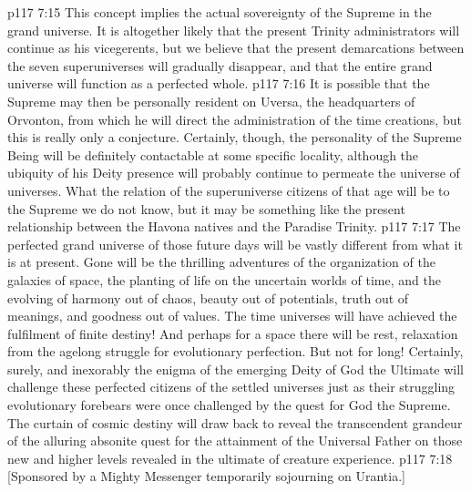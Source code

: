 \vs p117 7:15 This concept implies the actual sovereignty of the Supreme in the grand universe. It is altogether likely that the present Trinity administrators will continue as his vicegerents, but we believe that the present demarcations between the seven superuniverses will gradually disappear, and that the entire grand universe will function as a perfected whole.
\vs p117 7:16 It is possible that the Supreme may then be personally resident on Uversa, the headquarters of Orvonton, from which he will direct the administration of the time creations, but this is really only a conjecture. Certainly, though, the personality of the Supreme Being will be definitely contactable at some specific locality, although the ubiquity of his Deity presence will probably continue to permeate the universe of universes. What the relation of the superuniverse citizens of that age will be to the Supreme we do not know, but it may be something like the present relationship between the Havona natives and the Paradise Trinity.
\vs p117 7:17 \pc The perfected grand universe of those future days will be vastly different from what it is at present. Gone will be the thrilling adventures of the organization of the galaxies of space, the planting of life on the uncertain worlds of time, and the evolving of harmony out of chaos, beauty out of potentials, truth out of meanings, and goodness out of values. The time universes will have achieved the fulfilment of finite destiny! And perhaps for a space there will be rest, relaxation from the agelong struggle for evolutionary perfection. But not for long! Certainly, surely, and inexorably the enigma of the emerging Deity of God the Ultimate will challenge these perfected citizens of the settled universes just as their struggling evolutionary forebears were once challenged by the quest for God the Supreme. The curtain of cosmic destiny will draw back to reveal the transcendent grandeur of the alluring absonite quest for the attainment of the Universal Father on those new and higher levels revealed in the ultimate of creature experience.
\vsetoff
\vs p117 7:18 [Sponsored by a Mighty Messenger temporarily sojourning on Urantia.]
